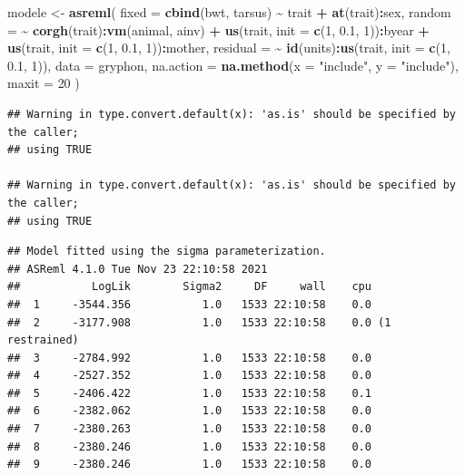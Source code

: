 \documentclass[
  12pt,
]{book}
\newenvironment{Shaded}{\begin{snugshade}}{\end{snugshade}}
\newcommand{\DataTypeTok}[1]{\textcolor[rgb]{0.13,0.29,0.53}{#1}}
\newcommand{\DecValTok}[1]{\textcolor[rgb]{0.00,0.00,0.81}{#1}}
\newcommand{\FloatTok}[1]{\textcolor[rgb]{0.00,0.00,0.81}{#1}}
\newcommand{\KeywordTok}[1]{\textcolor[rgb]{0.13,0.29,0.53}{\textbf{#1}}}
\newcommand{\NormalTok}[1]{#1}
\newcommand{\OperatorTok}[1]{\textcolor[rgb]{0.81,0.36,0.00}{\textbf{#1}}}
\newcommand{\StringTok}[1]{\textcolor[rgb]{0.31,0.60,0.02}{#1}}
\begin{document}
\begin{Shaded}
\begin{Highlighting}[]
\NormalTok{modele \textless{}{-}}\StringTok{ }\KeywordTok{asreml}\NormalTok{(}
  \DataTypeTok{fixed =} \KeywordTok{cbind}\NormalTok{(bwt, tarsus) }\OperatorTok{\textasciitilde{}}\StringTok{ }\NormalTok{trait }\OperatorTok{+}\StringTok{ }\KeywordTok{at}\NormalTok{(trait)}\OperatorTok{:}\NormalTok{sex,}
  \DataTypeTok{random =} \OperatorTok{\textasciitilde{}}\StringTok{ }\KeywordTok{corgh}\NormalTok{(trait)}\OperatorTok{:}\KeywordTok{vm}\NormalTok{(animal, ainv) }\OperatorTok{+}
\StringTok{    }\KeywordTok{us}\NormalTok{(trait, }\DataTypeTok{init =} \KeywordTok{c}\NormalTok{(}\DecValTok{1}\NormalTok{, }\FloatTok{0.1}\NormalTok{, }\DecValTok{1}\NormalTok{))}\OperatorTok{:}\NormalTok{byear }\OperatorTok{+}
\StringTok{    }\KeywordTok{us}\NormalTok{(trait, }\DataTypeTok{init =} \KeywordTok{c}\NormalTok{(}\DecValTok{1}\NormalTok{, }\FloatTok{0.1}\NormalTok{, }\DecValTok{1}\NormalTok{))}\OperatorTok{:}\NormalTok{mother,}
  \DataTypeTok{residual =} \OperatorTok{\textasciitilde{}}\StringTok{ }\KeywordTok{id}\NormalTok{(units)}\OperatorTok{:}\KeywordTok{us}\NormalTok{(trait, }\DataTypeTok{init =} \KeywordTok{c}\NormalTok{(}\DecValTok{1}\NormalTok{, }\FloatTok{0.1}\NormalTok{, }\DecValTok{1}\NormalTok{)),}
  \DataTypeTok{data =}\NormalTok{ gryphon,}
  \DataTypeTok{na.action =} \KeywordTok{na.method}\NormalTok{(}\DataTypeTok{x =} \StringTok{"include"}\NormalTok{, }\DataTypeTok{y =} \StringTok{"include"}\NormalTok{),}
  \DataTypeTok{maxit =} \DecValTok{20}
\NormalTok{)}
\end{Highlighting}
\end{Shaded}

\begin{verbatim}
## Warning in type.convert.default(x): 'as.is' should be specified by the caller;
## using TRUE

## Warning in type.convert.default(x): 'as.is' should be specified by the caller;
## using TRUE
\end{verbatim}

\begin{verbatim}
## Model fitted using the sigma parameterization.
## ASReml 4.1.0 Tue Nov 23 22:10:58 2021
##           LogLik        Sigma2     DF     wall    cpu
##  1     -3544.356           1.0   1533 22:10:58    0.0
##  2     -3177.908           1.0   1533 22:10:58    0.0 (1 restrained)
##  3     -2784.992           1.0   1533 22:10:58    0.0
##  4     -2527.352           1.0   1533 22:10:58    0.0
##  5     -2406.422           1.0   1533 22:10:58    0.1
##  6     -2382.062           1.0   1533 22:10:58    0.0
##  7     -2380.263           1.0   1533 22:10:58    0.0
##  8     -2380.246           1.0   1533 22:10:58    0.0
##  9     -2380.246           1.0   1533 22:10:58    0.0
\end{verbatim}
\end{document}
